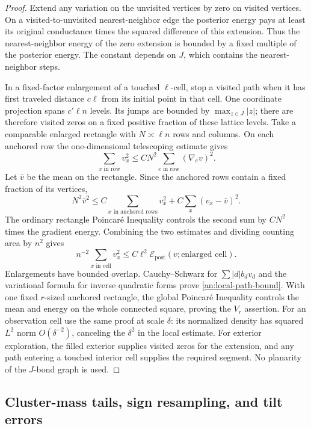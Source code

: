 \begin{proof}
Extend any variation on the unvisited vertices by zero on visited
vertices.  On a visited-to-unvisited nearest-neighbor edge the
posterior energy pays at least its original conductance times the
squared difference of this extension.  Thus the nearest-neighbor
energy of the zero extension is bounded by a fixed multiple of the
posterior energy.  The constant depends on $J$, which contains the
nearest-neighbor steps.

In a fixed-factor enlargement of a touched $\ell$-cell, stop a
visited path when it has first traveled distance $c\ell$ from its
initial point in that cell.  One coordinate projection spans
$c'\ell n$ levels.  Its jumps are bounded by $\max_{z\in J}|z|$;
there are therefore visited zeros on a fixed positive fraction of
these lattice levels.  Take a comparable enlarged rectangle with
$N\asymp\ell n$ rows and columns.  On each anchored row the
one-dimensional telescoping estimate gives
\[
 \sum_{x\text{ in row}}v_x^2
       \le C N^2\sum_{e\text{ in row}}(\nabla_ev)^2.
\]
Let $\bar v$ be the mean on the rectangle.  Since the anchored rows
contain a fixed fraction of its vertices,
\[
 N^2\bar v^2\le C\sum_{x\text{ in anchored rows}}v_x^2
                  +C\sum_x(v_x-\bar v)^2.
\]
The ordinary rectangle Poincar\'e Inequality controls the second sum
by $CN^2$ times the gradient energy.  Combining the two estimates
and dividing counting area by $n^2$ gives
\[
 n^{-2}\sum_{x\text{ in cell}}v_x^2
      \le C\ell^2\mathcal E_{\mathrm{post}}(v;
                                  \text{enlarged cell}).
\]
Enlargements have bounded overlap.  Cauchy--Schwarz for
$\sum |d|b_dv_d$ and the variational formula for inverse quadratic
forms prove \eqref{an:local-path-bound}.  With one fixed
$r$-sized anchored rectangle, the global Poincar\'e Inequality controls
the mean and energy on the whole connected square, proving the
$V_r$ assertion.  For an observation cell use the same proof at
scale $\delta$: its normalized density has squared $L^2$ norm
$O(\delta^{-2})$, canceling the $\delta^2$ in the local estimate.
For exterior exploration, the filled exterior supplies visited
zeros for the extension, and any path entering a touched interior
cell supplies the required segment.  No planarity of the $J$-bond
graph is used.
\end{proof}

\subsection{Cluster-mass tails, sign resampling, and tilt errors}

